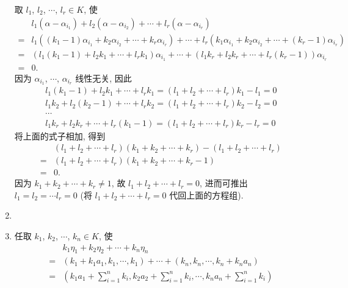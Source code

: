 \documentclass[a4paper, 11pt]{ctexart}
\begin{document}
\begin{enumerate}
            取 $l_1$, $l_2$, $\cdots$, $l_r \in K$, 使
            \begin{align*}
                & l_1(\alpha - \alpha_{i_1}) + l_2(\alpha - \alpha_{i_2}) + \cdots + l_r(\alpha - \alpha_{i_r}) \\
                ={} & l_1((k_1 - 1)\alpha_{i_1} + k_2\alpha_{i_2} + \cdots + k_r\alpha_{i_r}) + \cdots + l_r(k_1\alpha_{i_1} + k_2\alpha_{i_2} + \cdots + (k_r - 1)\alpha_{i_r}) \\
                ={} & (l_1(k_1 - 1) + l_2k_1 + \cdots + l_rk_1)\alpha_{i_1} + \cdots + (l_1k_r + l_2k_r + \cdots + l_r(k_r-1))\alpha_{i_r} \\
                ={} & 0.
            \end{align*}
            因为 $\alpha_{i_1}$, $\cdots$, $\alpha_{i_r}$ 线性无关, 因此
            \begin{gather*}
                l_1(k_1 - 1) + l_2k_1 + \cdots + l_rk_1 = (l_1 + l_2 + \cdots + l_r)k_1 - l_1 = 0 \\
                l_1k_2 + l_2(k_2-1) + \cdots + l_rk_2 = (l_1 + l_2 + \cdots + l_r)k_2 - l_2 = 0 \\
                \cdots \\
                l_1k_r + l_2k_r + \cdots + l_r(k_1-1) = (l_1 + l_2 + \cdots + l_r)k_r - l_r = 0
            \end{gather*}
            将上面的式子相加, 得到
            \begin{align*}
                & (l_1 + l_2 + \cdots + l_r)(k_1 + k_2 + \cdots + k_r) - (l_1 + l_2 + \cdots + l_r) \\
                ={} &  (l_1 + l_2 + \cdots + l_r)(k_1 + k_2 + \cdots + k_r - 1) \\
                ={} & 0.
            \end{align*}
            因为 $k_1 + k_2 + \cdots + k_r \neq 1$, 故 $l_1 + l_2 + \cdots + l_r = 0$, 进而可推出 $l_1 = l_2 = \cdots l_r = 0$ (将 $l_1 + l_2 + \cdots + l_r = 0$ 代回上面的方程组).
        \item %
        \item %
            任取 $k_1$, $k_2$, $\cdots$, $k_n \in K$, 使
            \begin{align*}
                & k_1\eta_1 + k_2\eta_2 + \cdots + k_n\eta_n \\
                ={} & (k_1 + k_1a_1, k_1, \cdots, k_1) + \cdots + (k_n, k_n, \cdots, k_n + k_na_n) \\
                ={} & \left(k_1a_1 + \sum_{i=1}^nk_i, k_2a_2 + \sum_{i=1}^nk_i, \cdots, k_na_n + \sum_{i=1}^nk_i\right) \\

\end{align*}
\end{enumerate}
\end{document}
